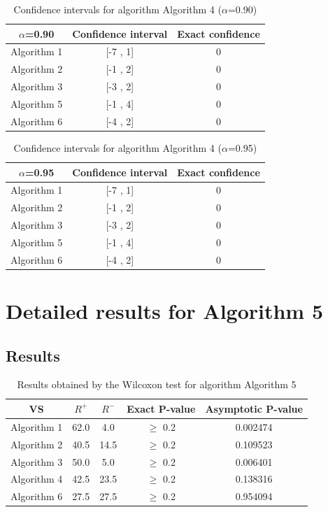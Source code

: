 \documentclass[a4paper,10pt]{article}
\begin{document}
\begin{table}[!htp]
\centering\small
\begin{tabular}{
|c|c|c|}
\hline
 $\alpha$=0.90 & Confidence interval & Exact confidence \\ \hline 
Algorithm 1 & [-7 , 1] & 0\\ \hline 
Algorithm 2 & [-1 , 2] & 0\\ \hline 
Algorithm 3 & [-3 , 2] & 0\\ \hline 
Algorithm 5 & [-1 , 4] & 0\\ \hline 
Algorithm 6 & [-4 , 2] & 0\\ \hline 

\end{tabular}
\caption{Confidence intervals for algorithm Algorithm 4 ($\alpha$=0.90)}
\end{table}
\begin{table}[!htp]
\centering\small
\begin{tabular}{
|c|c|c|}
\hline
 $\alpha$=0.95 & Confidence interval & Exact confidence \\ \hline 
Algorithm 1 & [-7 , 1] & 0\\ \hline 
Algorithm 2 & [-1 , 2] & 0\\ \hline 
Algorithm 3 & [-3 , 2] & 0\\ \hline 
Algorithm 5 & [-1 , 4] & 0\\ \hline 
Algorithm 6 & [-4 , 2] & 0\\ \hline 

\end{tabular}
\caption{Confidence intervals for algorithm Algorithm 4 ($\alpha$=0.95)}
\end{table}

 \clearpage 


\section{Detailed results for Algorithm 5}


\subsection{Results}

\begin{table}[!htp]
\centering\small
\begin{tabular}{
|c|c|c|c|c|}
\hline
 VS & $R^{+}$ & $R^{-}$ & Exact P-value & Asymptotic P-value \\ \hline 
Algorithm 1 & 62.0 & 4.0 & $\geq$ 0.2 & 0.002474\\ \hline 
Algorithm 2 & 40.5 & 14.5 & $\geq$ 0.2 & 0.109523\\ \hline 
Algorithm 3 & 50.0 & 5.0 & $\geq$ 0.2 & 0.006401\\ \hline 
Algorithm 4 & 42.5 & 23.5 & $\geq$ 0.2 & 0.138316\\ \hline 
Algorithm 6 & 27.5 & 27.5 & $\geq$ 0.2 & 0.954094\\ \hline 

\end{tabular}
\caption{Results obtained by the Wilcoxon test for algorithm Algorithm 5}
\end{table}
\end{document}
